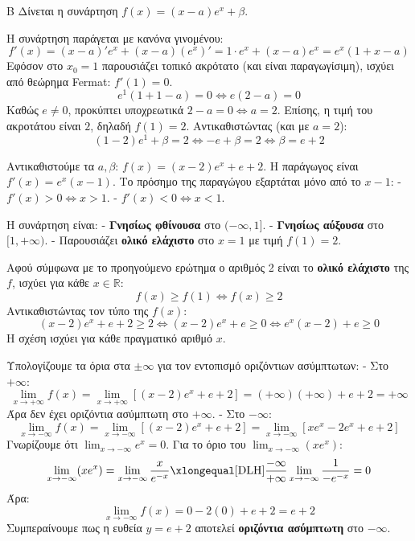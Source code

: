 \begin{thema}{Β}
Δίνεται η συνάρτηση $f(x) = (x-a)e^x + \beta$.
\begin{erwthma}
\item Η συνάρτηση παράγεται με κανόνα γινομένου:
\[ f'(x) = (x-a)'e^x + (x-a)(e^x)' = 1\cdot e^x + (x-a)e^x = e^x(1 + x - a) \]
Εφόσον στο $x_0 = 1$ παρουσιάζει τοπικό ακρότατο (και είναι παραγωγίσιμη), ισχύει από θεώρημα Fermat: $f'(1) = 0$.
\[ e^1(1 + 1 - a) = 0 \Leftrightarrow e(2-a) = 0 \]
Καθώς $e \ne 0$, προκύπτει υποχρεωτικά $2-a = 0 \Leftrightarrow a = 2$.
Επίσης, η τιμή του ακροτάτου είναι $2$, δηλαδή $f(1) = 2$. Αντικαθιστώντας (και με $a=2$):
\[ (1-2)e^1 + \beta = 2 \Leftrightarrow -e + \beta = 2 \Leftrightarrow \beta = e + 2 \]

\item Αντικαθιστούμε τα $a, \beta$: $f(x) = (x-2)e^x + e+2$.
Η παράγωγος είναι $f'(x) = e^x(x-1)$.
Το πρόσημο της παραγώγου εξαρτάται μόνο από το $x-1$:
- $f'(x) > 0 \Leftrightarrow x > 1$.
- $f'(x) < 0 \Leftrightarrow x < 1$.
\begin{center}
\end{center}
Η συνάρτηση είναι:
- \textbf{Γνησίως φθίνουσα} στο $(-\infty, 1]$.
- \textbf{Γνησίως αύξουσα} στο $[1, +\infty)$.
- Παρουσιάζει \textbf{ολικό ελάχιστο} στο $x=1$ με τιμή $f(1) = 2$.

\item Αφού σύμφωνα με το προηγούμενο ερώτημα ο αριθμός 2 είναι το \textbf{ολικό ελάχιστο} της $f$, ισχύει για κάθε $x \in \mathbb{R}$:
\[ f(x) \ge f(1) \Leftrightarrow f(x) \ge 2 \]
Αντικαθιστώντας τον τύπο της $f(x)$:
\[ (x-2)e^x + e + 2 \ge 2 \Leftrightarrow (x-2)e^x + e \ge 0 \Leftrightarrow e^x(x-2) + e \ge 0 \]
Η σχέση ισχύει για κάθε πραγματικό αριθμό $x$.

\item Υπολογίζουμε τα όρια στα $\pm\infty$ για τον εντοπισμό οριζόντιων ασύμπτωτων:
- Στο $+\infty$:
\[ \lim_{x\to+\infty} f(x) = \lim_{x\to+\infty} [(x-2)e^x + e + 2] = (+\infty)(+\infty) + e+2 = +\infty \]
Άρα δεν έχει οριζόντια ασύμπτωτη στο $+\infty$.
- Στο $-\infty$:
\[ \lim_{x\to-\infty} f(x) = \lim_{x\to-\infty} [(x-2)e^x + e + 2] = \lim_{x\to-\infty} [x e^x - 2e^x + e + 2] \]
Γνωρίζουμε ότι $\lim_{x\to-\infty} e^x = 0$.
Για το όριο του  $\lim_{x\to-\infty} (x e^x)$:
\[ \lim_{x\to-\infty} (x e^x) = \lim_{x\to-\infty} \frac{x}{e^{-x}} \xlongequal[\text{DLH}]{\frac{-\infty}{+\infty}} \lim_{x\to-\infty} \frac{1}{-e^{-x}} = 0 \]
Άρα:
\[ \lim_{x\to-\infty} f(x) = 0 - 2(0) + e + 2 = e + 2 \]
Συμπεραίνουμε πως η ευθεία $y = e+2$ αποτελεί \textbf{οριζόντια ασύμπτωτη} στο $-\infty$.
\end{erwthma}
\end{thema}

